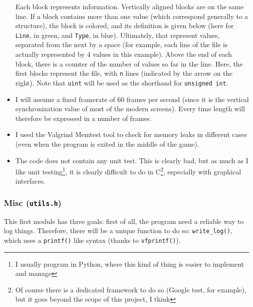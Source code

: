 \documentclass[12pt,a4paper]{article}
\newcommand{\cc}[1]{\texttt{#1}}
\begin{document}
\begin{itemize}
\begin{center}
\end{center}
Each block represents information. Vertically aligned blocks are on the same line. If a block contains more than one value (which correspond generally to a structure), the block is colored, and its definition is given below (here for \texttt{Line}, in green, and \texttt{Type}, in blue). Ultimately, that represent values, separated from the next by a space (for example, each line of the file is actually represented by 4 values in this example). Above the end of each block, there is a counter of the number of values so far in the line.
Here, the first blocks represent the file, with \texttt{n} lines (indicated by the arrow on the right). Note that \texttt{uint} will be used as the shorthand for \cc{unsigned int}.
\item I will assume  a fixed framerate of 60 frames per second (since it is the vertical synchronization value of most of the modern screens). Every time length will therefore be expressed in a number of frames. 
\item I used the Valgrind Memtest tool \cite{valgrind} to check for memory leaks in different cases (even when the program is exited in the middle of the game).
\item The code does not contain any unit test. This is clearly bad, but as much as I like unit testing\footnote{I usually program in Python, where this kind of thing is easier to implement and manage}, it is clearly difficult to do in C\footnote{Of course there is a dedicated framework to do so (Google test, for example), but it goes beyond the scope of this project, I think}, especially with graphical interfaces.
\end{itemize}

\subsubsection{Misc (\texttt{utils.h})}

This first module has three goals: first of all, the program need a reliable way to log things. Therefore, there will be a unique function to do so: \cc{write_log()}, which uses a \cc{printf()} like syntax (thanks to \cc{vfprintf()}).
\end{document}
